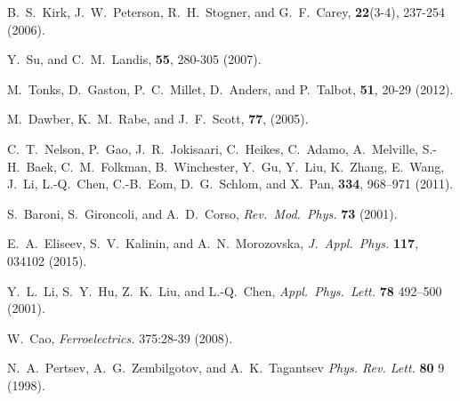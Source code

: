 \documentclass[22pt]{article} %
\begin{document}
\begin{thebibliography}{1}
B.~S.~Kirk, J.~W.~Peterson, R.~H.~Stogner, and G.~F.~Carey,
 \textbf{22}(3-4), 237-254 (2006).

Y.~Su, and C.~M.~Landis,
 \textbf{55}, 280-305 (2007).

M.~Tonks, D.~Gaston, P.~C.~Millet, D.~Anders, and P.~Talbot,
 \textbf{51}, 20-29 (2012).

M.~Dawber, K.~M.~Rabe, and J.~F.~Scott,
 \textbf{77}, (2005).

C.~T.~Nelson, P.~Gao, J.~R.~Jokisaari, C.~Heikes, C.~Adamo, A.~Melville, S.-H.~Baek, C.~M.~Folkman, B.~Winchester, Y.~Gu, Y.~Liu, K.~Zhang, 
E.~Wang, J.~Li, L.-Q.~Chen, C.-B.~Eom, D.~G.~Schlom, and X.~Pan,
 \textbf{334}, 968--971 (2011).

S.~Baroni, S.~Gironcoli, and A.~D.~Corso,
\newblock \emph{Rev.~Mod.~Phys.} \textbf{73} (2001).

E.~A.~Eliseev, S.~V.~Kalinin, and A.~N.~Morozovska,
\newblock \emph{J.~Appl.~Phys.} \textbf{117}, 034102 (2015).

Y.~L.~Li, S.~Y.~Hu, Z.~K.~Liu, and L.-Q.~Chen,
\newblock \emph{Appl.~Phys.~Lett.} \textbf{78} 492--500 (2001).

W.~Cao,
\newblock \emph{Ferroelectrics.} 375:28-39 (2008).

N.~A.~Pertsev, A.~G.~Zembilgotov, and A.~K.~Tagantsev
\newblock \emph{Phys. Rev. Lett.} \textbf{80} 9 (1998).


\end{thebibliography}
\end{document}
